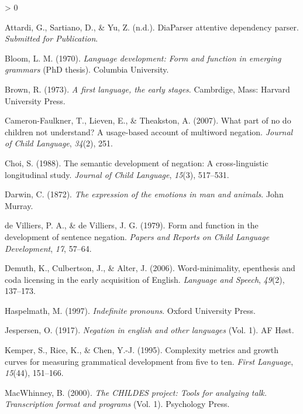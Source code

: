 \documentclass[
  english,
  man,floatsintext]{apa6}
\newlength{\cslhangindent}
\newenvironment{CSLReferences}[2] %
 {%
  \setlength{\parindent}{0pt}
  \ifodd #1 \everypar{\setlength{\hangindent}{\cslhangindent}}\ignorespaces\fi
  \ifnum #2 > 0
  \setlength{\parskip}{#2\baselineskip}
  \fi
 }%
 {}
\begin{document}
\hypertarget{refs}{}
\begin{CSLReferences}{1}{0}
\leavevmode\hypertarget{ref-diaparser}{}%
Attardi, G., Sartiano, D., \& Yu, Z. (n.d.). DiaParser attentive dependency parser. \emph{Submitted for Publication}.

\leavevmode\hypertarget{ref-bloom1970language}{}%
Bloom, L. M. (1970). \emph{Language development: Form and function in emerging grammars} (PhD thesis). Columbia University.

\leavevmode\hypertarget{ref-Brown1973}{}%
Brown, R. (1973). \emph{A first language, the early stages}. Cambrdige, Mass: Harvard University Press.

\leavevmode\hypertarget{ref-cameron2007part}{}%
Cameron-Faulkner, T., Lieven, E., \& Theakston, A. (2007). What part of no do children not understand? A usage-based account of multiword negation. \emph{Journal of Child Language}, \emph{34}(2), 251.

\leavevmode\hypertarget{ref-choi1988semantic}{}%
Choi, S. (1988). The semantic development of negation: A cross-linguistic longitudinal study. \emph{Journal of Child Language}, \emph{15}(3), 517--531.

\leavevmode\hypertarget{ref-darwin1872expression}{}%
Darwin, C. (1872). \emph{The expression of the emotions in man and animals}. John Murray.

\leavevmode\hypertarget{ref-de1979form}{}%
de Villiers, P. A., \& de Villiers, J. G. (1979). Form and function in the development of sentence negation. \emph{Papers and Reports on Child Language Development}, \emph{17}, 57--64.

\leavevmode\hypertarget{ref-demuth2006word}{}%
Demuth, K., Culbertson, J., \& Alter, J. (2006). Word-minimality, epenthesis and coda licensing in the early acquisition of {E}nglish. \emph{Language and Speech}, \emph{49}(2), 137--173.

\leavevmode\hypertarget{ref-haspelmath1997indefinite}{}%
Haspelmath, M. (1997). \emph{Indefinite pronouns}. Oxford University Press.

\leavevmode\hypertarget{ref-jespersen1917negation}{}%
Jespersen, O. (1917). \emph{Negation in english and other languages} (Vol. 1). AF H{ø}st.

\leavevmode\hypertarget{ref-kemper1995complexity}{}%
Kemper, S., Rice, K., \& Chen, Y.-J. (1995). Complexity metrics and growth curves for measuring grammatical development from five to ten. \emph{First Language}, \emph{15}(44), 151--166.

\leavevmode\hypertarget{ref-macwhinney2000childes}{}%
MacWhinney, B. (2000). \emph{The CHILDES project: Tools for analyzing talk. Transcription format and programs} (Vol. 1). Psychology Press.


\end{CSLReferences}
\end{document}
